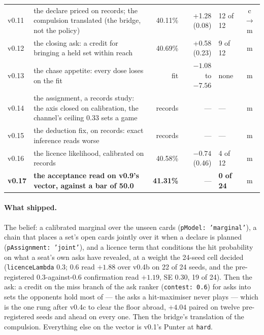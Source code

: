\documentclass[11pt]{article}
\newcommand{\code}[1]{\texttt{#1}}
\begin{document}
\begin{table}[t]
\begin{tabular}{@{}l p{} r r l c@{}}
v0.11 & the declare priced on records; the compulsion translated (the bridge, not the policy) & 40.11\% & +1.28 (0.08) & 12 of 12 & c$\to$m \\
v0.12 & the closing ask: a credit for bringing a held set within reach & 40.69\% & +0.58 (0.23) & 9 of 12 & m \\
v0.13 & the chase appetite: every dose loses on the fit & fit & $-1.08$ to $-7.56$ & none & m \\
v0.14 & the assignment, a records study: the axis closed on calibration, the channel's ceiling 0.33 sets a game & records & --- & --- & m \\
v0.15 & the deduction fix, on records: exact inference reads worse & records & --- & --- & m \\
v0.16 & the licence likelihood, calibrated on records & 40.58\% & $-0.74$ (0.46) & 4 of 12 & m \\
\textbf{v0.17} & \textbf{the acceptance read on v0.9's vector, against a bar of 50.0} & \textbf{41.31\%} & --- & \textbf{0 of 24} & m \\
\bottomrule
\end{tabular}
\end{table}

\paragraph{What shipped.} The belief: a calibrated marginal over the unseen cards
(\code{pModel: 'marginal'}), a chain that places a set's open cards jointly over it when a declare is
planned (\code{pAssignment: 'joint'}), and a licence term that conditions the hit probability on
what a seat's own asks have revealed, at a weight the 24-seed cell decided (\code{licenceLambda}
$0.3$; $0.6$ read $+1.88$ over v0.4b on 22 of 24 seeds, and the pre-registered $0.3$-against-$0.6$
confirmation read $+1.19$, SE $0.30$, 19 of 24). Then the ask: a credit on the miss branch of the
ask ranker (\code{contest: 0.6}) for asks into sets the opponents hold most of --- the asks a
hit-maximiser never plays --- which is the one rung after v0.4c to clear the floor abroad,
$+4.04$ paired on twelve pre-registered seeds and ahead on every one. Then the bridge's translation
of the compulsion. Everything else on the vector is v0.1's Punter at \code{hard}.
\end{document}

